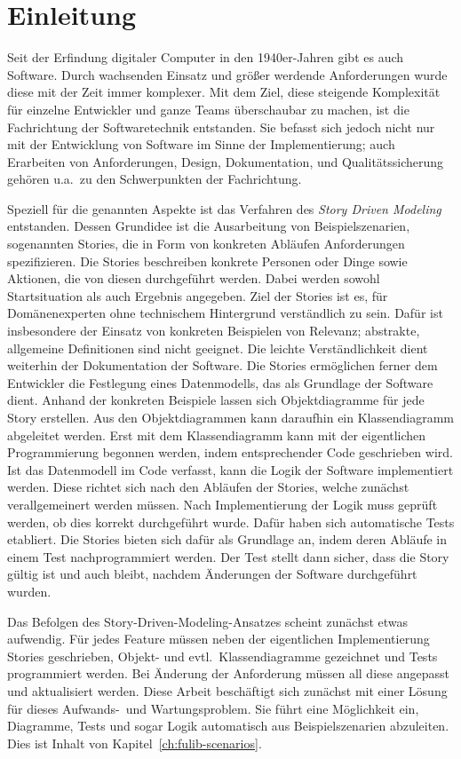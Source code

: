 \chapter{Einleitung}\label{ch:introduction}

Seit der Erfindung digitaler Computer in den 1940er-Jahren gibt es auch Software.
Durch wachsenden Einsatz und größer werdende Anforderungen wurde diese mit der Zeit immer komplexer.
Mit dem Ziel, diese steigende Komplexität für einzelne Entwickler und ganze Teams überschaubar zu machen, ist die Fachrichtung der Softwaretechnik entstanden.
Sie befasst sich jedoch nicht nur mit der Entwicklung von Software im Sinne der Implementierung;
auch Erarbeiten von Anforderungen, Design, Dokumentation, und Qualitätssicherung gehören u.a.\ zu den Schwerpunkten der Fachrichtung.

Speziell für die genannten Aspekte ist das Verfahren des \emph{Story Driven Modeling}~\cite{sdm} entstanden.
Dessen Grundidee ist die Ausarbeitung von Beispielszenarien, sogenannten Stories, die in Form von konkreten Abläufen Anforderungen spezifizieren.
Die Stories beschreiben konkrete Personen oder Dinge sowie Aktionen, die von diesen durchgeführt werden.
Dabei werden sowohl Startsituation als auch Ergebnis angegeben.
Ziel der Stories ist es, für Domänenexperten ohne technischem Hintergrund verständlich zu sein.
Dafür ist insbesondere der Einsatz von konkreten Beispielen von Relevanz;
abstrakte, allgemeine Definitionen sind nicht geeignet.
Die leichte Verständlichkeit dient weiterhin der Dokumentation der Software.
Die Stories ermöglichen ferner dem Entwickler die Festlegung eines Datenmodells, das als Grundlage der Software dient.
Anhand der konkreten Beispiele lassen sich Objektdiagramme für jede Story erstellen.
Aus den Objektdiagrammen kann daraufhin ein Klassendiagramm abgeleitet werden.
Erst mit dem Klassendiagramm kann mit der eigentlichen Programmierung begonnen werden, indem entsprechender Code geschrieben wird.
Ist das Datenmodell im Code verfasst, kann die Logik der Software implementiert werden.
Diese richtet sich nach den Abläufen der Stories, welche zunächst verallgemeinert werden müssen.
Nach Implementierung der Logik muss geprüft werden, ob dies korrekt durchgeführt wurde.
Dafür haben sich automatische Tests etabliert.
Die Stories bieten sich dafür als Grundlage an, indem deren Abläufe in einem Test nachprogrammiert werden.
Der Test stellt dann sicher, dass die Story gültig ist und auch bleibt, nachdem Änderungen der Software durchgeführt wurden.

Das Befolgen des Story-Driven-Modeling-Ansatzes scheint zunächst etwas aufwendig.
Für jedes Feature müssen neben der eigentlichen Implementierung Stories geschrieben, Objekt- und evtl.\ Klassendiagramme gezeichnet und Tests programmiert werden.
Bei Änderung der Anforderung müssen all diese angepasst und aktualisiert werden.
Diese Arbeit beschäftigt sich zunächst mit einer Lösung für dieses Aufwands-\ und Wartungsproblem.
Sie führt eine Möglichkeit ein, Diagramme, Tests und sogar Logik automatisch aus Beispielszenarien abzuleiten.
Dies ist Inhalt von Kapitel~\ref{ch:fulib-scenarios}.

